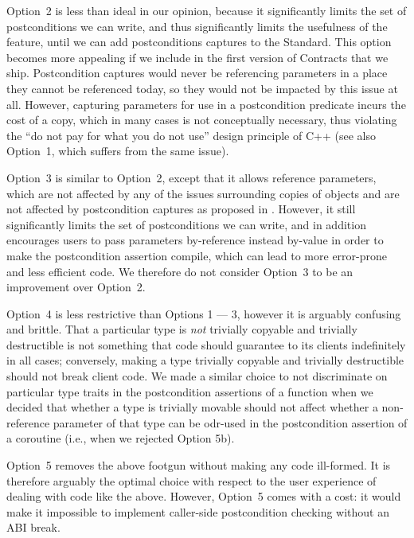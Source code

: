 Option~2 is less than ideal in our opinion, because it significantly limits the set of postconditions we can write, and thus significantly limits the usefulness of the feature, until we can add postconditions captures \cite{P3098R0} to the Standard. This option becomes more appealing if we include \cite{P3098R0} in the first version of Contracts that we ship. Postcondition captures would never be referencing parameters in a place they cannot be referenced today, so they would not be impacted by this issue at all. However, capturing parameters for use in a postcondition predicate incurs the cost of a copy, which in many cases is not conceptually necessary, thus violating the ``do not pay for what you do not use'' design principle of C++ (see also \cite{D3484R0} Option~1, which suffers from the same issue).

Option~3 is similar to Option~2, except that it allows reference parameters, which are not affected by any of the issues surrounding copies of objects and are not affected by postcondition captures as proposed in \cite{P3098R0}. However, it still significantly limits the set of postconditions we can write, and in addition encourages users to pass parameters by-reference instead by-value in order to make the postcondition assertion compile, which can lead to more error-prone and less efficient code. We therefore do not consider Option~3 to be an improvement over Option~2.

Option~4 is less restrictive than Options 1 --- 3, however it is arguably confusing and brittle. That a particular type is \emph{not} trivially copyable and trivially destructible is not something that code should guarantee to its clients indefinitely in all cases; conversely, making a type trivially copyable and trivially destructible should not break client code. We made a similar choice to not discriminate on particular type traits in the postcondition assertions of a function when we decided that whether a type is trivially movable should not affect whether a non-reference parameter of that type can be odr-used in the postcondition assertion of a coroutine (i.e., when we rejected \cite{P3387R0} Option 5b).

Option~5 removes the above footgun without making any code ill-formed. It is therefore arguably the optimal choice with respect to the user experience of dealing with code like the above. However, Option~5 comes with a cost: it would make it impossible to implement caller-side postcondition checking without an ABI break.

